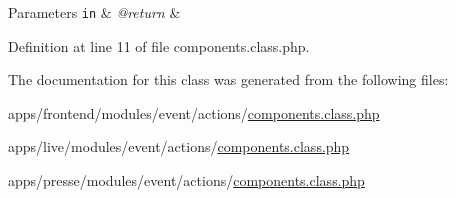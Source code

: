 \begin{DoxyParams}[1]{Parameters}
\mbox{\tt in}  & {\em @return} & \\
\hline
\end{DoxyParams}


Definition at line 11 of file components.\-class.\-php.



The documentation for this class was generated from the following files\-:\begin{DoxyCompactItemize}
\item 
apps/frontend/modules/event/actions/\hyperlink{frontend_2modules_2event_2actions_2components_8class_8php}{components.\-class.\-php}\item 
apps/live/modules/event/actions/\hyperlink{live_2modules_2event_2actions_2components_8class_8php}{components.\-class.\-php}\item 
apps/presse/modules/event/actions/\hyperlink{presse_2modules_2event_2actions_2components_8class_8php}{components.\-class.\-php}\end{DoxyCompactItemize}

